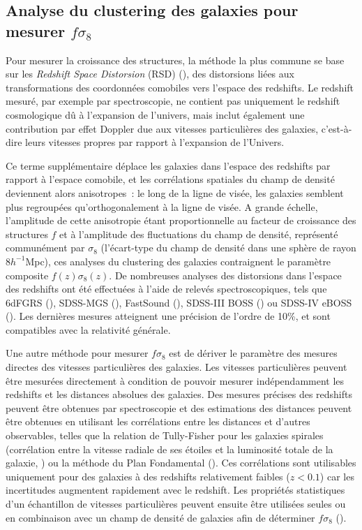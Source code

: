 \documentclass{book}
\begin{document}
\subsection{Analyse du clustering des galaxies pour mesurer $f\sigma_8$}

Pour mesurer la croissance des structures, la méthode la plus commune se base sur les \textit{Redshift Space Distorsion} (RSD) (\cite{kaiser_clustering_1987}), des distorsions liées aux transformations des coordonnées comobiles vers l'espace des redshifts. Le redshift mesuré, par exemple par spectroscopie, ne contient pas uniquement le redshift cosmologique dû à l'expansion de l'univers, mais inclut également une contribution par effet Doppler due aux vitesses particulières des galaxies, c'est-à-dire leurs vitesses propres par rapport à l'expansion de l'Univers.

Ce terme supplémentaire déplace les galaxies dans l'espace des redshifts par rapport à l'espace comobile, et les corrélations spatiales du champ de densité deviennent alors anisotropes~: le long de la ligne de visée, les galaxies semblent plus regroupées qu'orthogonalement à la ligne de visée. A grande échelle, l'amplitude de cette anisotropie étant proportionnelle au facteur de croissance des structures $f$ et à l'amplitude des fluctuations du champ de densité, représenté communément par $\sigma_8$ (l'écart-type du champ de densité dans une sphère de rayon 8$h^{-1}$Mpc), ces analyses du clustering des galaxies contraignent le paramètre composite $f(z)\sigma_8(z)$. De nombreuses analyses des distorsions dans l'espace des redshifts ont été effectuées à l'aide de relevés spectroscopiques, tels que 6dFGRS (\cite{beutler_6df_2012}), SDSS-MGS (\cite{howlett_clustering_2015}), FastSound (\cite{okumura_subaru_2016}), SDSS-III BOSS (\cite{alam_clustering_2017}) ou SDSS-IV eBOSS (\cite{eboss_collaboration_completed_2021}). Les dernières mesures atteignent une précision de l'ordre de 10\%, et sont compatibles avec la relativité générale.

Une autre méthode pour mesurer $f\sigma_8$ est de dériver le paramètre des mesures directes des vitesses particulières des galaxies. Les vitesses particulières peuvent être mesurées directement à condition de pouvoir mesurer indépendamment les redshifts et les distances absolues des galaxies. Des mesures précises des redshifts peuvent être obtenues par spectroscopie et des estimations des distances peuvent être obtenues en utilisant les corrélations entre les distances et d'autres observables, telles que la relation de Tully-Fisher pour les galaxies spirales (corrélation entre la vitesse radiale de ses étoiles et la luminosité totale de la galaxie, \cite{tully_new_1977}) ou la méthode du Plan Fondamental (\cite{djorgovski_fundamental_1987}). Ces corrélations sont utilisables uniquement pour des galaxies à des redshifts relativement faibles ($z < 0.1$) car les incertitudes augmentent rapidement avec le redshift. Les propriétés statistiques d'un échantillon de vitesses particulières peuvent ensuite être utilisées seules ou en combinaison avec un champ de densité de galaxies afin de déterminer $f\sigma_8$ (\cite{adams_joint_2020, qin_redshift_2019, turner_local_2023}).
\end{document}
